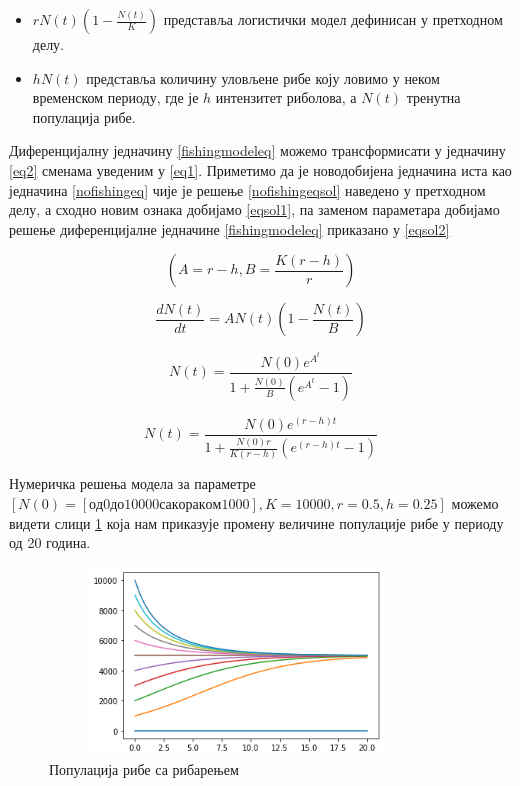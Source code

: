 \documentclass[a4paper]{article}
\begin{document}
{\begin{itemize}
  \item $ rN(t)\left(1-\frac{N(t)}{K}\right)$ представља логистички модел дефинисан у претходном делу.
  \item $hN(t)$  представља количину уловљене рибе коју ловимо у неком временском периоду, где је $h$ интензитет риболова, а $N(t)$ тренутна популација рибе.
\end{itemize}
Диференцијалну једначину \ref{fishingmodeleq} можемо трансформисати у једначину \ref{eq2} сменама уведеним у \ref{eq1}. Приметимо да је новодобијена једначина иста као једначина \ref{nofishingeq} чије је решење \ref{nofishingeqsol} наведено у претходном делу, а сходно новим ознака добијамо \ref{eqsol1}, па заменом параметара добијамо решење диференцијалне једначине \ref{fishingmodeleq} приказано у \ref{eqsol2}

\begin{equation}
    \label{eq1}
    \left(A = r-h, B = \frac{K(r-h)}{r}\right)
\end{equation}

\begin{equation}
    \label{eq2}
    \frac{dN(t)}{dt} = AN(t)\left(1-\frac{N(t)}{B}\right)
\end{equation}

\begin{equation}
    \label{eqsol1}
    N(t) = \frac{N(0)e^A^t}{1+\frac{N(0)}{B}(e^A^t - 1)}
\end{equation}

\begin{equation}
    \label{eqsol2}
    N(t) = \frac{N(0)e^{(r-h)t}}{1+\frac{N(0)r}{K(r-h)}(e^{(r-h)t} - 1)}
\end{equation}

Нумеричка решења модела за параметре $[N(0)=[од 0 до 10000 са кораком 1000],  K=10000, r=0.5, h=0.25] $ можемо видети слици \ref{fishingmodel_view} која нам приказује промену величине популације рибе у периоду од 20 година.

 \begin{figure}[h!]
	\centering
	\includegraphics[width=10cm,height=5cm]{images/FishingModel.png}
	\caption{Популација рибе са рибарењем}
	\label{fishingmodel_view}
\end{figure}

}
\end{document}
